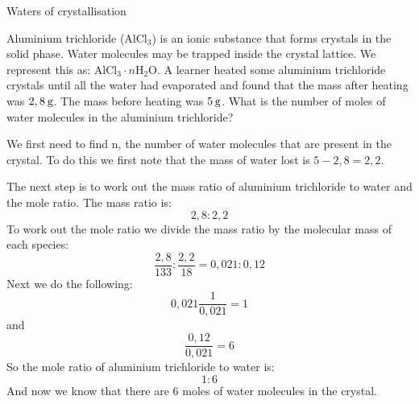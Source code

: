     \noindent
\par
            \label{m38712*eid672431}\vspace{.5cm} 
      \noindent
      \begin{wex}{Waters of crystallisation}{
\label{m38712*pid47982}
\label{m38712*id64827}Aluminium trichloride (${\mathrm{AlCl}}_{3}$) is an ionic substance that forms crystals in the solid phase. Water molecules may be trapped inside the crystal lattice. We represent this as: ${\mathrm{AlCl}}_{3}\ensuremath{\cdot}n{\mathrm{H}}_{2}\mathrm{O}$. A learner heated some aluminium trichloride crystals until all the water had evaporated and found that the mass after heating was $2,8\phantom{\rule{2pt}{0ex}}\mathrm{g}$. The mass before heating was $5\phantom{\rule{2pt}{0ex}}\mathrm{g}$. What is the number of moles of water molecules in the aluminium trichloride?\par 
\vspace{5pt}}
{
We first need to find n, the number of water molecules that are present in the crystal. To do this we first note that the mass of water lost is $5-2,8=2,2$.\pagebreak \par \item \label{m38712*id3892}The next step is to work out the mass ratio of aluminium trichloride to water and the mole ratio. The mass ratio is:
 \label{m38712*eid744672}\nopagebreak\noindent{}
    \begin{equation}
    2,8:2,2\tag{18.35}
      \end{equation}
To work out the mole ratio we divide the mass ratio by the molecular mass of each species:
\label{m38712*eid7459432}\nopagebreak\noindent{}
    \begin{equation}
    \frac{2,8}{133}:\frac{2,2}{18}=0,021:0,12\tag{18.36}
      \end{equation}
Next we do the following:
\label{m38712*eid745932432}\nopagebreak\noindent{}
    \begin{equation}
    0,021\frac{1}{0,021}=1\tag{18.37}
      \end{equation}
     and
\label{m38712*eid74595432432}\nopagebreak\noindent{}
    \begin{equation}
    \frac{0,12}{0,021}=6\tag{18.38}
      \end{equation}
So the mole ratio of aluminium trichloride to water is:
\label{m38712*eid7459424532}\nopagebreak\noindent{}
    \begin{equation}
    1:6\tag{18.39}
      \end{equation}
And now we know that there are 6 moles of water molecules in the crystal.\par 
}
    \end{wex}
